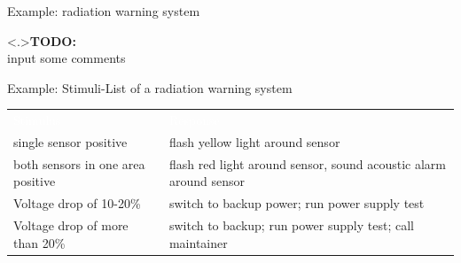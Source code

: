 \documentclass[ngerman={babel}, utf8, bigger, xcolor={table,dvipsnames}, ompress, hyperref={bookmarks,colorlinks}]{beamer}
\begin{document}
\begin{frame}{Example: radiation warning system}
	
	{\textbf{TODO:}\\ input some comments}
\end{frame}

\begin{frame}{Example: Stimuli-List of a radiation warning system}
	\begin{tabular}{p{9em}p{13em}}
		\rowcolor{structure.fg}\hline \textcolor{white}{Stimulus} & \textcolor{white}{Response} \pause \\
		single sensor positive & flash yellow light around sensor \pause \\
		both sensors in one area positive & flash red light around sensor, sound acoustic alarm around sensor \pause \\
		Voltage drop of 10-20\% & switch to backup power; run power supply test \pause \\
		Voltage drop of more than 20\% & switch to backup; run power supply test; call maintainer \\
	\end{tabular}
\end{frame}
\end{document}
